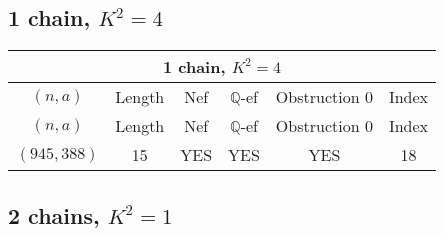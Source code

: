 \subsection{1 chain, $K^2 = 4$}
\begin{longtable}{|c|c|c|c|c|c|}
\hline
\multicolumn{6}{|c|}{1 chain, $K^2 = 4$}\\
\hline
$(n,a)$ & Length & Nef & $\mathbb Q$-ef & Obstruction 0 & Index\\
\hline
\endfirsthead

\hline
$(n,a)$ & Length & Nef & $\mathbb Q$-ef & Obstruction 0 & Index\\
\hline
\endhead
\hline
\endfoot

$(945, 388)$ & 15 & YES & YES & YES & 18
\end{longtable}
\subsection{2 chains, $K^2 = 1$}
